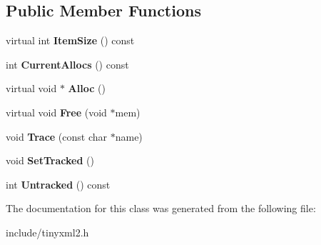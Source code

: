 \subsection*{Public Member Functions}
\begin{DoxyCompactItemize}
\item 
\hypertarget{classtinyxml2_1_1_mem_pool_t_a7ec8778fe99f6e332615a703be0b48bc}{}virtual int {\bfseries Item\+Size} () const \label{classtinyxml2_1_1_mem_pool_t_a7ec8778fe99f6e332615a703be0b48bc}

\item 
\hypertarget{classtinyxml2_1_1_mem_pool_t_a56be11b7db6a7ef00db17088a7769aab}{}int {\bfseries Current\+Allocs} () const \label{classtinyxml2_1_1_mem_pool_t_a56be11b7db6a7ef00db17088a7769aab}

\item 
\hypertarget{classtinyxml2_1_1_mem_pool_t_aa9d785a48ffe6ea1be679bab13464486}{}virtual void $\ast$ {\bfseries Alloc} ()\label{classtinyxml2_1_1_mem_pool_t_aa9d785a48ffe6ea1be679bab13464486}

\item 
\hypertarget{classtinyxml2_1_1_mem_pool_t_a4f1a0c434e9e3d7391e5c16ed4ee8c70}{}virtual void {\bfseries Free} (void $\ast$mem)\label{classtinyxml2_1_1_mem_pool_t_a4f1a0c434e9e3d7391e5c16ed4ee8c70}

\item 
\hypertarget{classtinyxml2_1_1_mem_pool_t_a0bc596f271e0f139822c534238b3f244}{}void {\bfseries Trace} (const char $\ast$name)\label{classtinyxml2_1_1_mem_pool_t_a0bc596f271e0f139822c534238b3f244}

\item 
\hypertarget{classtinyxml2_1_1_mem_pool_t_a7798932414916199a1bc0f9c3f368521}{}void {\bfseries Set\+Tracked} ()\label{classtinyxml2_1_1_mem_pool_t_a7798932414916199a1bc0f9c3f368521}

\item 
\hypertarget{classtinyxml2_1_1_mem_pool_t_a524b90d0edeac41964c06510757dce0f}{}int {\bfseries Untracked} () const \label{classtinyxml2_1_1_mem_pool_t_a524b90d0edeac41964c06510757dce0f}

\end{DoxyCompactItemize}


The documentation for this class was generated from the following file\+:\begin{DoxyCompactItemize}
\item 
include/tinyxml2.\+h\end{DoxyCompactItemize}

